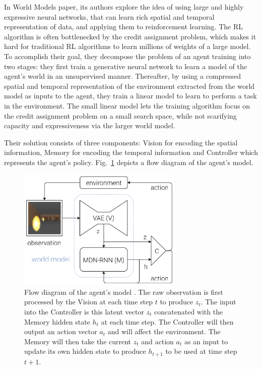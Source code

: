 In World Models \cite{Algo.WorldModels} paper, its authors explore the idea of using large and highly expressive neural networks, that can learn rich spatial and temporal representation of data, and applying them to reinforcement learning. The RL algorithm is often bottlenecked by the credit assignment problem, which makes it hard for traditional RL algorithms to learn millions of weights of a large model. To accomplish their goal, they decompose the problem of an agent training into two stages: they first train a generative neural network to learn a model of the agent's world in an unsupervised manner. Thereafter, by using a compressed spatial and temporal representation of the environment extracted from the world model as inputs to the agent, they train a linear model to learn to perform a task in the environment. The small linear model lets the training algorithm focus on the credit assignment problem on a small search space, while not scarifying capacity and expressiveness via the larger world model.

Their solution consists of three components: Vision for encoding the spatial information, Memory for encoding the temporal information and Controller which represents the agent's policy. Fig.~\ref{Fig.WorldModels} depicts a flow diagram of the agent's model.

\begin{figure}[H]
\includegraphics[width=0.7\textwidth,keepaspectratio]{figures/WorldModels.png}
\caption[Flow diagram of the World Models agent's model]{Flow diagram of the agent's model \protect\cite{Algo.WorldModels}. The raw observation is first processed by the Vision at each time step $t$ to produce $z_t$. The input into the Controller is this latent vector $z_t$ concatenated with the Memory hidden state $h_t$ at each time step. The Controller will then output an action vector $a_t$ and will affect the environment. The Memory will then take the current $z_t$ and action $a_t$ as an input to update its own hidden state to produce $h_{t+1}$ to be used at time step $t + 1$.}
\label{Fig.WorldModels}
\end{figure}

